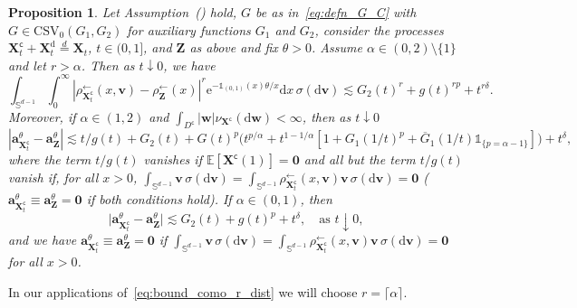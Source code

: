 \documentclass[en,oneside,bbfont,article]{amsart}
\newtheorem{proposition}[theorem]{Proposition}
\theoremstyle{remark}
\theoremstyle{definition}
\theoremstyle{definition}
\newcommand\Sp{\mathbb{S}}
\newcommand\R{\mathbb{R}}
\newcommand\E{\mathds{E}}
\newcommand\e{\mathord{\mathrm{e}}}
\newcommand\1{\mathds{1}}
\newcommand\CSV{\mathrm{CSV}}
\newcommand\da{\downarrow}
\newcommand\la{\leftarrow}
\renewcommand\le{\leqslant}
\newcommand\eqd{\overset{d}{=}}
\newcommand\co{\mathsf{c}}
\newcommand{\D}{\mathrm{d}}
\newcommand{\ov}[1]{\overline{#1}}
\begin{document}
\begin{proposition}
\label{prop:integrals_DoA_como} 
Let Assumption~() hold, $G$ be as in~\eqref{eq:defn_G_C} with $G \in \CSV_0(G_1,G_2)$ for auxiliary functions $G_1$ and $G_2$, consider the processes $\bm{X}_t^\co+\bm{X}_t^\D\eqd\bm{X}_t$, $t\in(0,1]$, and $\bm{Z}$ as above and fix $\theta>0$. Assume $\alpha \in (0,2)\setminus\{1\}$ and let $r>\alpha$. Then as $t \da 0$, we have
\begin{equation}\label{eq:bound_como_r_dist}
    \int_{\Sp^{d-1}}\int_0^\infty
|\rho_{\bm{X}_t^\co}^{\la}(x,\bm{v})-\rho_{\bm{Z}}^{\la}(x)|^r \e^{-\1_{(0,1)}(x)\theta /x} \D x \, \sigma(\D \bm{v}) 
\lesssim G_2(t)^r + g(t)^{r p}+ t^{r \delta}.
\end{equation}    
Moreover, if $\alpha \in (1,2)$ and $\int_{D^\co}|\bm{w}|\nu_{\bm{X}^\co}(\D\bm{w})<\infty$, then as $t \da 0$
\begin{equation*}%
|\bm{a}_{\bm{X}_t^\co}^\theta
    -\bm{a}_{\bm{Z}}^\theta| 
\lesssim t/g(t)+G_2(t)
+G(t)^p\big(t^{p/\alpha}+t^{1-1/\alpha}[1+G_1(1/t)^p +\ov{G}_1(1/t)\1_{\{p=\alpha-1\}}]\big) +t^{\delta},
\end{equation*} 
where the term $t/g(t)$ vanishes if $\E[\bm{X}^\co(1)]=\bm{0}$ and all but the term $t/g(t)$ vanish if, for all $x>0$, $\int_{\Sp^{d-1}}\bm{v}\,\sigma(\D\bm{v})=\int_{\Sp^{d-1}}\rho^{\la}_{\bm{X}_t^\co}(x,\bm{v})\bm{v}\,\sigma(\D\bm{v})=\bm{0}$ ($\bm{a}_{\bm{X}^\co_t}^\theta\equiv \bm{a}_{\bm{Z}}^\theta=\bm{0}$ if both conditions hold). If $\alpha\in(0,1)$, then
\[
\big|\bm{a}_{\bm{X}^\co_t}^\theta-\bm{a}_{\bm{Z}}^\theta\big|
\lesssim G_2(t) + g(t)^{p} + t^{\delta},
\quad\text{as }t\da 0,
\]
and we have $\bm{a}_{\bm{X}^\co_t}^\theta \equiv \bm{a}_{\bm{Z}}^\theta = \bm{0}$ if $\int_{\Sp^{d-1}}\bm{v}\,\sigma(\D\bm{v}) = \int_{\Sp^{d-1}}\rho^{\la}_{\bm{X}_t^\co}(x,\bm{v})\bm{v}\,\sigma(\D\bm{v})=\bm{0}$ for all $x>0$.
\end{proposition}

In our applications of~\eqref{eq:bound_como_r_dist} we will choose $r=\lceil\alpha\rceil$. 
\end{document}
